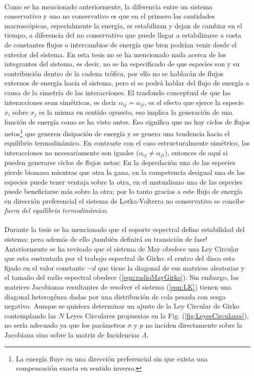 \\
Como se ha mencionado anteriormente, la diferencia entre un sistema conservativo y uno no conservativo es que en el primero las cantidades macroscópicas, especialmente la energía, se estabilizan y dejan de cambiar en el tiempo, a diferencia del no conservativo que puede llegar a estabilizarse a costa de constantes flujos o intercambios de energía que bien podrían venir desde el exterior del sistema. En esta tesis no se ha mencionado nada acerca de los integrantes del sistema, es decir, no se ha especificado de que especies son y su contribución dentro de la cadena trófica, por ello no se hablarán de flujos externos de energía hacia el sistema, pero si se podrá hablar del flujo de energía a causa de la simetría de las interacciones.
\newpage
El trasfondo conceptual de que las interacciones sean simétricas, es decir $\alpha_{ij}=\alpha_{ji}$, es el efecto que ejerce la especie $x_i$ sobre $x_j$ es la misma en sentido opuesto, eso implica la generación de una función de energía como se ha visto antes. Eso significa que no hay ciclos de flujos netos\footnote{La energía fluye en una dirección preferencial sin que exista una compensación exacta en sentido inverso.} que generen disipación de energía y se genera una tendencia hacia el equilibrio termodinámico. En contraste con el caso estructuralmente simétrico, las interacciones no necesariamente son iguales ($\alpha_{ij}\neq\alpha_{ji}$), entonces de aquí si pueden generarse ciclos de flujos netos: En la depredación una de las especies pierde biomasa mientras que otra la gana, en la competencia desigual una de las especies puede tener ventaja sobre la otra, en el mutualismo una de las especies puede beneficiarse más sobre la otra; por lo tanto gracias a este flujo de energía en dirección preferencial el sistema de Lotka-Volterra no conservativo se concibe \textit{fuera del equilibrio termodinámico}.\\
\\
Durante la tesis se ha mencionado que el soporte espectral define estabilidad del sistema; pero además de ello ¡también definirá su transición de fase! Anteriormente se ha revisado que el sistema de May obedece una Ley Circular que esta sustentada por el trabajo espectral de Girko: el centro del disco esta fijado en el valor constante $-d$ que tiene la diagonal de sus matrices aleatorias y el tamaño del radio espectral obedece (\ref{eqn:radioMayGirko}). Sin embargo, las matrices Jacobianas resultantes de resolver el sistema (\ref{eqn:LK}) tienen una diagonal heterogénea dadas por una distribución de cola pesada con sesgo negativo. Aunque se quisiera determinar un ajuste de la Ley Circular de Girko contemplando las $N$ Leyes Circulares propuestas en la Fig. (\ref{fig:LeyesCirculares}), no sería adecuado ya que los parámetros $\sigma$ y $p$ no inciden directamente sobre la Jacobiana sino sobre la matriz de Incidencias $\Lambda$.\\
